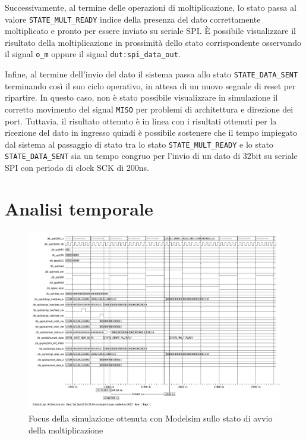 \documentclass[titlepage]{report}
\begin{document}
		Successivamente, al termine delle operazioni di moltiplicazione, lo stato passa al valore \texttt{STATE\_MULT\_READY} indice della presenza del dato correttamente moltiplicato e pronto per essere inviato su seriale SPI. È possibile visualizzare il risultato della moltiplicazione in prossimità dello stato corrispondente osservando il signal \texttt{o\_m} oppure il signal \texttt{dut:spi\_data\_out}.

		Infine, al termine dell'invio del dato il sistema passa allo stato \texttt{STATE\_DATA\_SENT} terminando così il suo ciclo operativo, in attesa di un nuovo segnale di reset per ripartire. In questo caso, non è stato possibile visualizzare in simulazione il corretto movimento del signal \texttt{MISO} per problemi di architettura e direzione dei port.
		Tuttavia, il risultato ottenuto è in linea con i risultati ottenuti per la ricezione del dato in ingresso quindi è possibile sostenere che il tempo impiegato dal sistema al passaggio di stato tra lo stato \texttt{STATE\_MULT\_READY} e lo stato \texttt{STATE\_DATA\_SENT} sia un tempo congruo per l'invio di un dato di 32bit su seriale SPI con periodo di clock SCK di 200ns.

	\section*{Analisi temporale}
	\label{sec:Analisi_Temporale}
		\begin{figure}[H]
			\centering
			\includegraphics[scale=0.5]{./img/sim_zoom_mult.pdf}
			\caption{Focus della simulazione ottenuta con Modelsim sullo stato di avvio della moltiplicazione}
			\label{fig:modelsim_sim_completa1}
		\end{figure}
\end{document}
